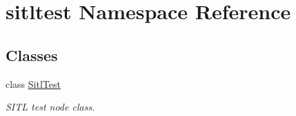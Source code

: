 \hypertarget{namespacesitltest}{}\section{sitltest Namespace Reference}
\label{namespacesitltest}
\subsection*{Classes}
\begin{DoxyCompactItemize}
\item 
class \mbox{\hyperlink{classsitltest_1_1SitlTest}{Sitl\+Test}}
\begin{DoxyCompactList}\small\item\em S\+I\+TL test node class. \end{DoxyCompactList}\end{DoxyCompactItemize}
